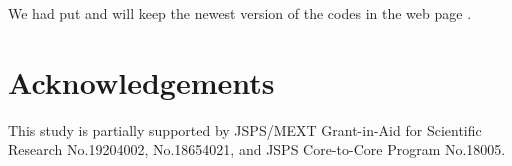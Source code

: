 \documentclass{svmult}
\begin{document}
We had put and will keep the newest version of the codes 
in the web page \cite{web:SFMT}.

\section*{Acknowledgements}
This study is partially
supported by JSPS/MEXT Grant-in-Aid for Scientific Research
No.19204002, No.18654021, and JSPS Core-to-Core Program
No.18005.



\end{document}
